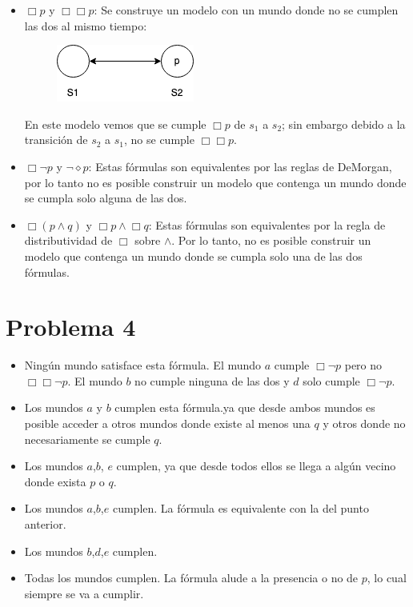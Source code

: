\documentclass[letterpaper,12pt]{memoir}
\theoremstyle{definition}
\begin{document}
\begin{itemize}
	\item \(\Box p\) y \(\Box\Box p\): Se construye un modelo con un mundo donde no se cumplen las dos al mismo tiempo:
	
	\begin{figure}[H]
		\centering
		\includegraphics{world}
	\end{figure}

	En este modelo vemos que se cumple \(\Box p\) de \(s_1\) a \(s_2\); sin embargo debido a la transición de \(s_2\) a \(s_1\), no se cumple \(\Box\Box p\).
	
	\item \(\Box\neg p\) y \(\neg\diamond p\): Estas fórmulas son equivalentes por las reglas de DeMorgan, por lo tanto no es posible construir un modelo que contenga un mundo donde se cumpla solo alguna de las dos.
	
	\item \(\Box(p \land q)\) y \(\Box p \land \Box q\): Estas fórmulas son equivalentes por la regla de distributividad de \(\Box\) sobre \(\land\). Por lo tanto, no es posible construir un modelo que contenga un mundo donde se cumpla solo una de las dos fórmulas.
\end{itemize}

\section*{Problema 4}

\begin{itemize}
	\item Ningún mundo satisface esta fórmula. El mundo \(a\) cumple \(\Box\neg p\) pero no \(\Box\Box\neg p\). El mundo \(b\) no cumple ninguna de las dos y \(d\) solo cumple \(\Box\neg p\).
	\item Los mundos \(a\) y \(b\) cumplen esta fórmula.ya que desde ambos mundos es posible acceder a otros mundos donde existe al menos una \(q\) y otros donde no necesariamente se cumple \(q\).
	\item Los mundos \(a\),\(b\), \(e\) cumplen, ya que desde todos ellos se llega a algún vecino donde exista \(p\) o \(q\).
	\item Los mundos \(a\),\(b\),\(e\) cumplen. La fórmula es equivalente con la del punto anterior.
	\item Los mundos \(b\),\(d\),\(e\) cumplen.
	\item Todas los mundos cumplen. La fórmula alude a la presencia o no de \(p\), lo cual siempre se va a cumplir.
\end{itemize}
\end{document}
